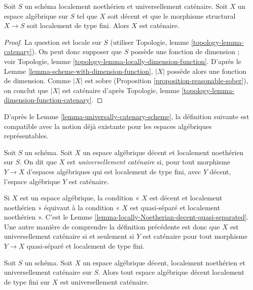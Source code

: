 \begin{lemma}
\label{lemma-universally-catenary-scheme}
Soit $S$ un schéma localement noethérien et universellement caténaire.
Soit $X$ un espace algébrique sur $S$ tel que $X$ soit décent et que le
morphisme structural $X \to S$ soit localement de type fini. Alors $X$ est
caténaire.
\end{lemma}

\begin{proof}
La question est locale sur $S$ (utiliser Topologie, lemme
\ref{topology-lemma-catenary}).
On peut donc supposer que $S$ possède une fonction de dimension ; voir
Topologie, lemme \ref{topology-lemma-locally-dimension-function}.
D'après le Lemme \ref{lemma-scheme-with-dimension-function},
$|X|$ possède alors une fonction de dimension.
Comme $|X|$ est sobre (Proposition \ref{proposition-reasonable-sober}),
on conclut que $|X|$ est caténaire d'après Topologie, lemme
\ref{topology-lemma-dimension-function-catenary}.
\end{proof}

\noindent
D'après le Lemme \ref{lemma-universally-catenary-scheme}, la définition
suivante est compatible avec la notion déjà existante pour les espaces
algébriques représentables.

\begin{definition}
\label{definition-universally-catenary}
Soit $S$ un schéma. Soit $X$ un espace algébrique décent et localement
noethérien sur $S$. On dit que $X$ est {\it universellement caténaire} si,
pour tout morphisme $Y \to X$ d'espaces algébriques qui est localement de
type fini, avec $Y$ décent, l'espace algébrique $Y$ est caténaire.
\end{definition}

\noindent
Si $X$ est un espace algébrique, la condition « $X$ est décent et localement
noethérien » équivaut à la condition « $X$ est quasi-séparé et localement
noethérien ». C'est le
Lemme \ref{lemma-locally-Noetherian-decent-quasi-separated}.
Une autre manière de comprendre la définition précédente est donc que $X$
est universellement caténaire si et seulement si $Y$ est caténaire pour tout
morphisme $Y \to X$ quasi-séparé et localement de type fini.

\begin{lemma}
\label{lemma-universally-catenary}
Soit $S$ un schéma. Soit $X$ un espace algébrique décent, localement
noethérien et universellement caténaire sur $S$. Alors tout espace algébrique
décent localement de type fini sur $X$ est universellement caténaire.
\end{lemma}

